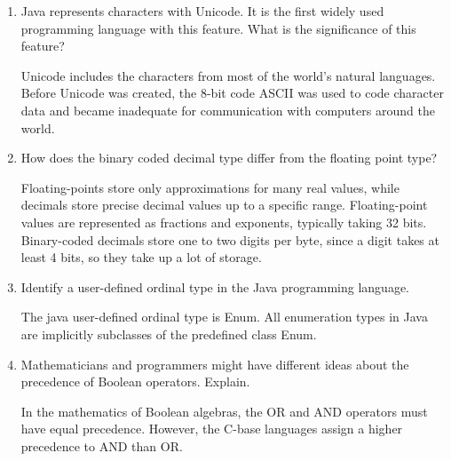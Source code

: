 \begin{enumerate}
\begin{answer}
    \end{answer}

  \item Java represents characters with Unicode. It is the first
    widely used programming language with this feature. What is the
    significance of this feature?

  \begin{answer}

    Unicode includes the characters from most of the world's natural
    languages. Before Unicode was created, the 8-bit code ASCII was
    used to code character data and became inadequate for
    communication with computers around the world.

    \end{answer}

  \item How does the binary coded decimal type differ from the
    floating point type?

  \begin{answer}

    Floating-points store only approximations for many real values,
    while decimals store precise decimal values up to a specific
    range. Floating-point values are represented as fractions and
    exponents, typically taking 32 bits. Binary-coded decimals store
    one to two digits per byte, since a digit takes at least 4 bits,
    so they take up a lot of storage.

    \end{answer}

  \item Identify a user-defined ordinal type in the Java programming
    language.

  \begin{answer}

    The java user-defined ordinal type is Enum. All enumeration types
    in Java are implicitly subclasses of the predefined class Enum.

    \end{answer}

  \item Mathematicians and programmers might have different ideas
    about the precedence of Boolean operators. Explain.

  \begin{answer}

    In the mathematics of Boolean algebras, the OR and AND operators
    must have equal precedence. However, the C-base languages assign a
    higher precedence to AND than OR.


\end{answer}
\end{enumerate}
